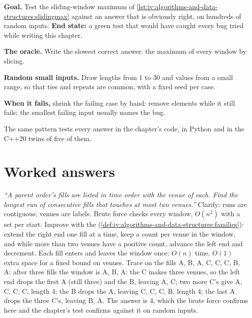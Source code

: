 \begin{tutorial}
\textbf{Goal.} Test the sliding-window maximum of \cref{lst:iv:algorithms-and-data-structures:slidingmax} against an answer
that is obviously right, on hundreds of random inputs. \textbf{End state:} a green test that would have caught every bug
tried while writing this chapter.
\begin{tutsteps}
\item \textbf{The oracle.} Write the slowest correct answer: the maximum of every window by slicing.
\label{lst:iv:algorithms-and-data-structures:oracle}
\item \textbf{Random small inputs.} Draw lengths from 1 to 30 and values from a small range, so that ties and repeats are
common, with a fixed seed per case.
\label{lst:iv:algorithms-and-data-structures:property}
\item \textbf{When it fails,} shrink the failing case by hand: remove elements while it still fails; the smallest failing
input usually names the bug.
\end{tutsteps}
The same pattern tests every answer in the chapter's code, in Python and in the C++20 twins of five of them.
\end{tutorial}

\section{Worked answers}

\begin{example}\label{ex:iv:algorithms-and-data-structures:venues}
\emph{``A parent order's fills are listed in time order with the venue of each. Find the longest run of consecutive fills
that touches at most two venues.''} Clarify: runs are contiguous; venues are labels. Brute force checks every window, $O(n^2)$
with a set per start. Improve with the  (\cref{def:iv:algorithms-and-data-structures:families}): extend
the right end one fill at a time, keep a count per venue in the window, and while more than two venues have a positive count,
advance the left end and decrement. Each fill enters and leaves the window once: $O(n)$ time, $O(1)$ extra space for a fixed
bound on venues. Trace on the fills A, B, A, C, C, C, B, A: after three fills the window is A, B, A; the C makes three venues, so the
left end drops the first A (still three) and the B, leaving A, C; two more C's give A, C, C, C, length 4; the B drops the
A, leaving C, C, C, B, length 4; the last A drops the three C's, leaving B, A. The answer is 4, which the brute force
confirms here and the chapter's test confirms against it on random inputs.
\end{example}

